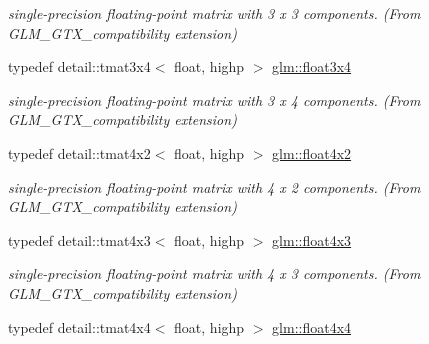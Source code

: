 \begin{CompactItemize}
\begin{CompactList}\small\item\em single-precision floating-point matrix with 3 x 3 components. (From GLM\_\-GTX\_\-compatibility extension) \item\end{CompactList}\item 
\hypertarget{group__gtx__compatibility_g53eb75b08b92aa34886397150c983943}{
typedef detail::tmat3x4$<$ float, highp $>$ \hyperlink{group__gtx__compatibility_g53eb75b08b92aa34886397150c983943}{glm::float3x4}}
\label{group__gtx__compatibility_g53eb75b08b92aa34886397150c983943}

\begin{CompactList}\small\item\em single-precision floating-point matrix with 3 x 4 components. (From GLM\_\-GTX\_\-compatibility extension) \item\end{CompactList}\item 
\hypertarget{group__gtx__compatibility_gb805aa2d6bbd5edddf78bd2e9322e6c7}{
typedef detail::tmat4x2$<$ float, highp $>$ \hyperlink{group__gtx__compatibility_gb805aa2d6bbd5edddf78bd2e9322e6c7}{glm::float4x2}}
\label{group__gtx__compatibility_gb805aa2d6bbd5edddf78bd2e9322e6c7}

\begin{CompactList}\small\item\em single-precision floating-point matrix with 4 x 2 components. (From GLM\_\-GTX\_\-compatibility extension) \item\end{CompactList}\item 
\hypertarget{group__gtx__compatibility_g72398a5d715031923beca8907c52f5d6}{
typedef detail::tmat4x3$<$ float, highp $>$ \hyperlink{group__gtx__compatibility_g72398a5d715031923beca8907c52f5d6}{glm::float4x3}}
\label{group__gtx__compatibility_g72398a5d715031923beca8907c52f5d6}

\begin{CompactList}\small\item\em single-precision floating-point matrix with 4 x 3 components. (From GLM\_\-GTX\_\-compatibility extension) \item\end{CompactList}\item 
\hypertarget{group__gtx__compatibility_g1f48a19e35b3640cf3d509041f7a800b}{
typedef detail::tmat4x4$<$ float, highp $>$ \hyperlink{group__gtx__compatibility_g1f48a19e35b3640cf3d509041f7a800b}{glm::float4x4}}
\label{group__gtx__compatibility_g1f48a19e35b3640cf3d509041f7a800b}


\end{CompactItemize}
